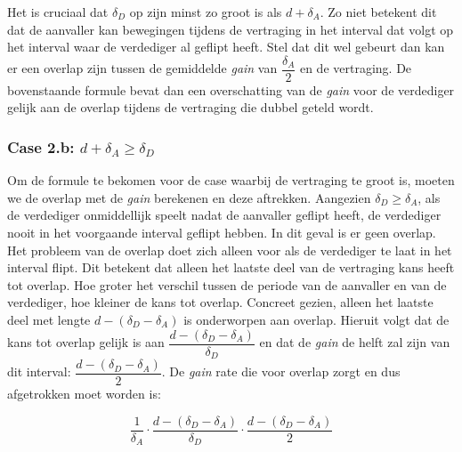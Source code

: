 \documentclass[master=cws, masteroption=vs,english]{kulemt}
\begin{document}
\begin{abstract*}
Het is cruciaal dat $ \delta_{D}$ op zijn minst zo groot is als $d + \delta_{A}$. Zo niet betekent dit dat de aanvaller kan bewegingen tijdens de vertraging in het interval dat volgt op het interval waar de verdediger al geflipt heeft. Stel dat dit wel gebeurt dan kan er een overlap zijn tussen de gemiddelde \textit{gain} van $\dfrac{\delta_{A}}{2}$ en de vertraging. De bovenstaande formule bevat dan een overschatting van de \textit{gain} voor de verdediger gelijk aan de overlap tijdens de vertraging die dubbel geteld wordt. 

\subsubsection*{\textbf{Case 2.b:} $d + \delta_{A} \geq \delta_{D}$}
Om de formule te bekomen voor de case waarbij de vertraging te groot is, moeten we de overlap met de \textit{gain} berekenen en deze aftrekken. 
Aangezien $\delta_{D} \geq \delta_{A}$, als de verdediger onmiddellijk speelt nadat de aanvaller geflipt heeft, de verdediger nooit in het voorgaande interval geflipt hebben. In dit geval is er geen overlap. Het probleem van de overlap doet zich alleen voor als de verdediger te laat in het interval flipt. Dit betekent dat alleen het laatste deel van de vertraging kans heeft tot overlap. Hoe groter het verschil tussen de periode van de aanvaller en van de verdediger, hoe kleiner de kans tot overlap. Concreet gezien, alleen het laatste deel met lengte $d - (\delta_{D} - \delta_{A})$ is onderworpen aan overlap. Hieruit volgt dat de kans tot overlap gelijk is aan $\dfrac{ d - (\delta_{D} - \delta_{A})}{\delta_{D}}$ en dat de \textit{gain} de helft zal zijn van dit interval: $\dfrac{ d - (\delta_{D} - \delta_{A})}{2}$.  De \textit{gain} rate die voor overlap zorgt en dus afgetrokken moet worden is:

\begin{equation}\label{first}
\dfrac{1} {\delta_{A}} \cdot \dfrac{d - (\delta_{D} - \delta_{A})}{\delta_{D}} \cdot \dfrac{d - (\delta_{D} - \delta_{A})}{2}
\end{equation}


\end{abstract*}
\end{document}
